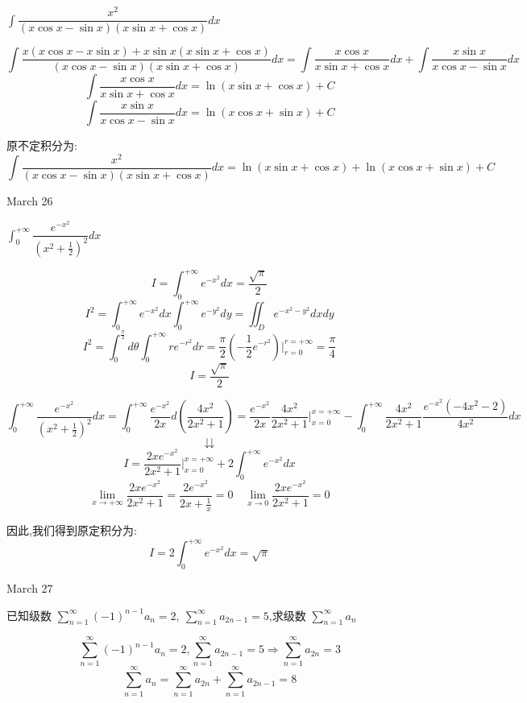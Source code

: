 \begin{example}[][Exam: 29.4.8]
	$\int\dfrac{x^2}{(x\cos x-\sin x)(x\sin x+\cos x)}dx$
\end{example}

\begin{solution}
	
	$$\int\frac{x(x\cos x-x\sin x)+x\sin x(x\sin x+\cos x)}{(x\cos x-\sin x)(x\sin x+\cos x)}dx=\int\frac{x\cos x}{x\sin x+\cos x}dx+\int\frac{x\sin x}{x\cos x-\sin x}dx$$
	$$\int\frac{x\cos x}{x\sin x+\cos x}dx=\ln(x\sin x+\cos x)+C$$
	$$\int\frac{x\sin x}{x\cos x-\sin x}dx=\ln(x\cos x+\sin x)+C$$
	
	原不定积分为: 
	$$\int\frac{x^2}{(x\cos x-\sin x)(x\sin x+\cos x)}dx=\ln(x\sin x+\cos x)+\ln(x\cos x+\sin x)+C$$
\end{solution}

\textcolor{purplea}{March 26}

\begin{example}[][Exam: 29.4.9]
	$\int_{0}^{+\infty}\dfrac{e^{-x^2}}{(x^2+\frac{1}{2})^2}dx$
\end{example}

\begin{lemma}[特殊积分]
	
	$$I=\int_{0}^{+\infty}e^{-x^2}dx=\frac{\sqrt{\pi}}{2}$$
	$$I^2=\int_{0}^{+\infty}e^{-x^2}dx\int_{0}^{+\infty}e^{-y^2}dy=\iint_{D}e^{-x^2-y^2}dxdy$$
	$$I^2=\int_{0}^{\frac{\pi}{2}}d\theta\int_{0}^{+\infty}re^{-r^2}dr=\frac{\pi}{2}(-\frac{1}{2}e^{-r^2})|_{r=0}^{r=+\infty}=\frac{\pi}{4}$$
	$$I=\frac{\sqrt{\pi}}{2}$$
\end{lemma}

\begin{solution}
	$$\int_{0}^{+\infty}\frac{e^{-x^2}}{(x^2+\frac{1}{2})^2}dx=\int_{0}^{+\infty}\frac{e^{-x^2}}{2x}d(\frac{4x^2}{2x^2+1})=\frac{e^{-x^2}}{2x}\frac{4x^2}{2x^2+1}|_{x=0}^{x=+\infty}-\int_{0}^{+\infty}\frac{4x^2}{2x^2+1}\frac{e^{-x^2}(-4x^2-2)}{4x^2}dx$$
	$$\downdownarrows$$
	$$I=\frac{2xe^{-x^2}}{2x^2+1}|_{x=0}^{x=+\infty}+2\int_{0}^{+\infty}e^{-x^2}dx$$
	$$\lim\limits_{x\rightarrow +\infty}\frac{2xe^{-x^2}}{2x^2+1}=\frac{2e^{-x^2}}{2x+\frac{1}{x}}=0 \quad \lim\limits_{x\rightarrow 0}\frac{2xe^{-x^2}}{2x^2+1}=0$$
	
	因此,我们得到原定积分为: 
	$$I=2\int_{0}^{+\infty}e^{-x^2}dx=\sqrt{\pi}$$
\end{solution}

\textcolor{purplea}{March 27}

\begin{example}[][Exam: 29.4.10]
	已知级数 $\sum\limits_{n=1}^{\infty}(-1)^{n-1}a_{n}=2,\ \sum\limits_{n=1}^{\infty}a_{2n-1}=5$,求级数 $\sum\limits_{n=1}^{\infty}a_{n}$
\end{example}
\begin{solution}
	
	$$\sum\limits_{n=1}^{\infty}(-1)^{n-1}a_{n}=2,\sum\limits_{n=1}^{\infty}a_{2n-1}=5\Rightarrow \sum\limits_{n=1}^{\infty}a_{2n}=3$$
	$$\sum\limits_{n=1}^{\infty}a_{n}=\sum\limits_{n=1}^{\infty}a_{2n}+\sum\limits_{n=1}^{\infty}a_{2n-1}=8$$
\end{solution}

